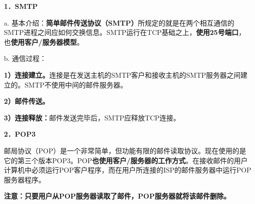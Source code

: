 \textbf{{1．SMTP}}

a.
基本介绍：\textbf{简单邮件传送协议（SMTP）}所规定的就是在两个相互通信的SMTP进程之间应如何交换信息。SMTP运行在TCP基础之上，{\textbf{使用25号端口}}，也\textbf{{使用客户/服务器模型}}。

b.
通信过程：

\textbf{1）连接建立。}连接是在发送主机的SMTP客户和接收主机的SMTP服务器之间建立的。SMTP不使用中间的邮件服务器。

\textbf{2）邮件传送。}

\textbf{3）连接释放：}邮件发送完毕后，SMTP应释放TCP连接。

\textbf{{2．POP3}}

邮局协议（POP）是一个非常简单，但功能有限的邮件读取协议。现在使用的是它的第三个版本POP3。POP\textbf{{也使用客户/服务器的工作方式}}。在接收邮件的用户计算机中必须运行POP客户程序，而在用户所连接的ISP的邮件服务器中运行POP服务器程序。

\textbf{{注意：}只要用户从POP服务器读取了邮件，POP服务器就将该邮件删除。}

